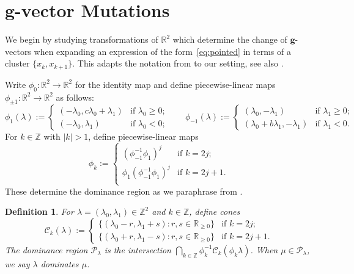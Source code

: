 \documentclass[pdflatex,sn-mathphys]{sn-jnl}%
\theoremstyle{thmstyleone}%
\theoremstyle{thmstyletwo}%
\theoremstyle{thmstylethree}%
\newtheorem{definition}[theorem]{Definition}
\newcommand{\bfg}{\boldsymbol{g}}
\newcommand{\cC}{\mathcal{C}}
\newcommand{\cP}{\mathcal{P}}
\newcommand{\RR}{\mathbb{R}}
\newcommand{\ZZ}{\mathbb{Z}}
\begin{document}
\section{$\bfg$-vector Mutations}
\label{sec:tropical}

  We begin by studying transformations of $\RR^2$ which determine the change of $\bfg$-vectors when expanding an expression of the form~\eqref{eq:pointed} in terms of a cluster $\{x_k,x_{k+1}\}$.
  This adapts the notation from \cite[Definition 2.1.4]{Qin19} to our setting, see also \cite[Definition 4.1]{Rea14}.

  Write $\phi_0:\RR^2\to\RR^2$ for the identity map and define piecewise-linear maps $\phi_{\pm 1}:\RR^2\to\RR^2$ as follows:
  \begin{equation}
    \label{eq:forward mutation 1}
    \phi_1(\lambda)
    :=
    \begin{cases} 
      (-\lambda_0,c\lambda_0+\lambda_1) & \text{if $\lambda_0 \ge 0$;}\\
      (-\lambda_0,\lambda_1) & \text{if $\lambda_0 < 0$;}
    \end{cases}
    \qquad
    \phi_{-1}(\lambda)
    :=
    \begin{cases} 
      (\lambda_0,-\lambda_1) & \text{if $\lambda_1 \ge 0$;}\\
      (\lambda_0+b\lambda_1,-\lambda_1) & \text{if $\lambda_1 < 0$.}
    \end{cases}
  \end{equation}
  For $k\in\ZZ$ with $|k|>1$, define piecewise-linear maps
  \[\phi_k
    :=
    \begin{cases}
      (\phi_{-1}^{-1}\phi_1)^j & \text{if $k=2j$;}\\
      \phi_1(\phi_{-1}^{-1}\phi_1)^j & \text{if $k=2j+1$.}\\
    \end{cases}
  \]
  These determine the dominance region as we paraphrase from \cite[Section 3.1]{Qin19}.
  \begin{definition}
    \label{def:dominance}
    For $\lambda=(\lambda_0,\lambda_1)\in\ZZ^2$ and $k\in\ZZ$, define cones 
    \[\cC_k(\lambda)
      :=
      \begin{cases}
        \{(\lambda_0-r,\lambda_1+s):r,s\in\RR_{\ge0}\} & \text{if $k=2j$;}\\
        \{(\lambda_0+r,\lambda_1-s):r,s\in\RR_{\ge0}\} & \text{if $k=2j+1$.}
      \end{cases}
    \]
    The \emph{dominance region} $\cP_\lambda$ is the intersection  $\bigcap_{k\in\ZZ}\phi_k^{-1}\cC_k(\phi_k\lambda)$.
    When $\mu\in\cP_\lambda$, we say \emph{$\lambda$ dominates $\mu$}.
  \end{definition}
\end{document}
